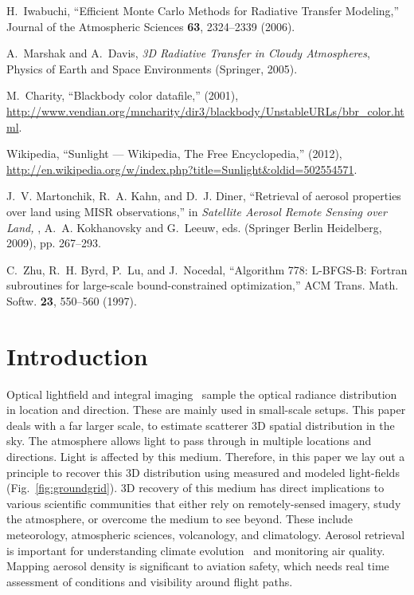 \documentclass[10pt,letterpaper]{article}
\begin{document}
\begin{thebibliography}{10}
H.~Iwabuchi, \enquote{{Efficient Monte Carlo Methods for Radiative Transfer
  Modeling},} Journal of the Atmospheric Sciences \textbf{63}, 2324--2339
  (2006).

A.~Marshak and A.~Davis, \emph{{3D Radiative Transfer in Cloudy Atmospheres}},
  Physics of Earth and Space Environments (Springer, 2005).

M.~Charity, \enquote{{Blackbody color datafile},}  (2001), \url{http://www.vendian.org/mncharity/dir3/blackbody/UnstableURLs/bbr\_color.html}.

Wikipedia, \enquote{{Sunlight --- {W}ikipedia{,} The Free Encyclopedia},}  (2012), \url{http://en.wikipedia.org/w/index.php?title=Sunlight\&oldid=502554571}.

J.~V. Martonchik, R.~A. Kahn, and D.~J. Diner, \enquote{{Retrieval of aerosol
  properties over land using MISR observations},} in \emph{{Satellite Aerosol
  Remote Sensing over Land,}} , A.~A. Kokhanovsky and G.~Leeuw, eds. (Springer
  Berlin Heidelberg, 2009), pp. 267--293.

C.~Zhu, R.~H. Byrd, P.~Lu, and J.~Nocedal, \enquote{{Algorithm 778: L-BFGS-B:
  Fortran subroutines for large-scale bound-constrained optimization},} ACM
  Trans. Math. Softw. \textbf{23}, 550--560 (1997).

\end{thebibliography}


\section{Introduction}
\label{sec:intro}

Optical lightfield and integral imaging~\cite{Stern2006,kim,Ng1948}
sample the optical radiance distribution in location and
direction. These are mainly used in small-scale setups. This paper
deals with a far larger scale, to estimate scatterer 3D spatial
distribution in the sky.  The atmosphere allows light to pass through
in multiple locations and directions. Light is affected by this
medium. Therefore, in this paper we lay out a principle to recover
this 3D distribution using measured and modeled light-fields
(Fig.~\ref{fig:groundgrid}).
3D recovery of this medium has direct implications to various
scientific communities that either rely on remotely-sensed imagery,
study the atmosphere, or overcome the medium to see beyond. These
include meteorology, atmospheric sciences, volcanology, and
climatology.  Aerosol retrieval is important for understanding climate
evolution~\cite{Dayan2008,kalashnikova} and monitoring air
quality. Mapping aerosol density is significant to aviation safety,
which needs real time assessment of conditions and visibility around
flight paths.
\end{document}
